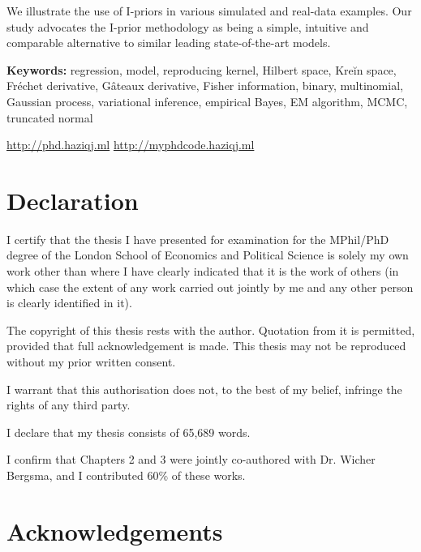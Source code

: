 \documentclass[11pt,twoside,openright]{report}
\begin{document}
We illustrate the use of I-priors in various simulated and real-data examples. 
Our study advocates the I-prior methodology as being a simple, intuitive and comparable alternative to similar leading state-of-the-art models. 


\vspace{1em}
{\noindent\textbf{Keywords:} 
	regression, model, reproducing kernel, Hilbert space, Kreĭn space, Fréchet derivative, Gâteaux derivative, Fisher information, binary, multinomial, Gaussian process, variational inference, empirical Bayes, EM algorithm, MCMC, truncated normal
}

\vfill

\begin{center}
  \url{http://phd.haziqj.ml} \textbullet{} \url{http://myphdcode.haziqj.ml}
\end{center}

\chapter*{Declaration} 

I certify that the thesis I have presented for examination for the MPhil/PhD degree of the London School of Economics and Political Science is solely my own work other than where I have clearly indicated that it is the work of others (in which case the extent of any work carried out jointly by me and any other person is clearly identified in it).

The copyright of this thesis rests with the author. Quotation from it is permitted, provided that full acknowledgement is made. 
This thesis may not be reproduced without my prior written consent.

I warrant that this authorisation does not, to the best of my belief, infringe the rights of any third party.

I declare that my thesis consists of 65,689 words.

I confirm that Chapters 2 and 3 were jointly co-authored with Dr. Wicher Bergsma, and I contributed 60\% of these works.


\chapter*{Acknowledgements} 
\end{document}
